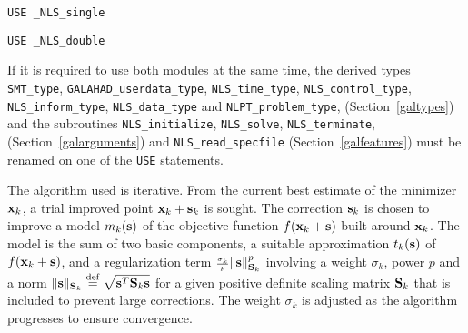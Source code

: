 \documentclass{galahad}
\newcommand{\packagename}{NLS}
\newcommand{\fullpackagename}{\libraryname\_\packagename}
\begin{document}
\hspace{8mm} {\tt USE \fullpackagename\_single}

\medskip{}

\hspace{8mm} {\tt USE  \fullpackagename\_double}

\medskip

\noindent
If it is required to use both modules at the same time, the derived types
{\tt SMT\_type},
{\tt GALAHAD\_userdata\_type},
{\tt \packagename\_time\_\-type},
{\tt \packagename\_control\_type},
{\tt \packagename\_inform\_type},
{\tt \packagename\_data\_type}
and
{\tt NLPT\_problem\_type},
(Section~\ref{galtypes})
and the subroutines
{\tt \packagename\_initialize},
{\tt \packagename\_\-solve},
{\tt \packagename\_terminate},
(Section~\ref{galarguments})
and
{\tt \packagename\_read\_specfile}
(Section~\ref{galfeatures})
must be renamed on one of the {\tt USE} statements.


\galterminology
The algorithm used is iterative. From the current best estimate
of the minimizer ${\mathbf{x}}_k$, a trial improved point ${\mathbf{x}}_k + {\mathbf{s}}_k$ is sought.
The correction ${\mathbf{s}}_k$ is chosen to improve a model $m_k({\mathbf{s}})$ of
the objective function $f({\mathbf{x}}_k+{\mathbf{s}})$ built around
${\mathbf{x}}_k$. The model is the sum of two basic components,
a suitable approximation $t_k({\mathbf{s}})$ of $f({\mathbf{x}}_k+{\mathbf{s}})$,
and a regularization term ${\scriptstyle \frac{\sigma_k}{p}} \|{\mathbf{s}}\|_{{\mathbf{S}}_k}^p$
involving a weight $\sigma_k$, power $p$ and
a norm $\|{\mathbf{s}}\|_{{\mathbf{S}}_k} \stackrel{\rm def}{=} \sqrt{{\mathbf{s}}^T {\mathbf{S}}_k {\mathbf{s}}}$ for a given positive
definite scaling matrix ${\mathbf{S}}_k$ that is included to prevent large corrections.
The weight  $\sigma_k$ is adjusted as the algorithm progresses to
ensure convergence.
\end{document}
